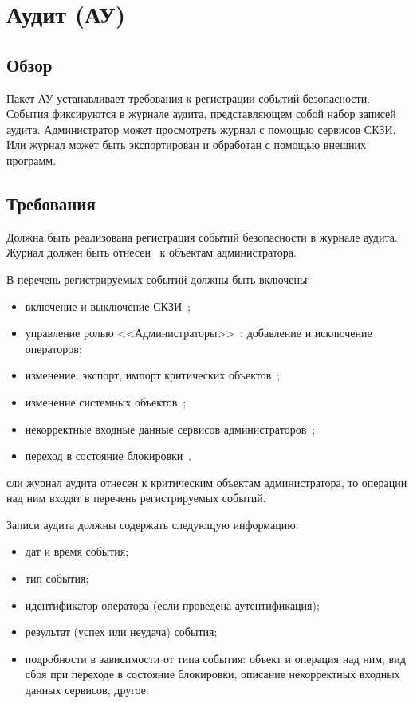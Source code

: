 \section{Аудит (АУ)}\label{AU}

\subsection{Обзор}\label{AU.Defs}

Пакет АУ устанавливает требования к регистрации событий безопасности.
События фиксируются в журнале аудита, представляющем собой набор 
записей аудита.
%
Администратор может просмотреть журнал с помощью сервисов СКЗИ.
Или журнал может быть экспортирован и обработан с помощью внешних программ.

\subsection{Требования}\label{AU.Reqs}


\label{R.AU.Log} %
Должна быть реализована регистрация событий безопасности в журнале аудита. 
Журнал должен быть отнесен~ к объектам администратора.

\label{R.AU.Events} %
В перечень регистрируемых событий должны быть включены:
\begin{itemize} 
\item
включение и выключение СКЗИ~;
\item
управление ролью <<Администраторы>>~: 
добавление и исключение операторов; 
\item
изменение, экспорт, импорт критических объектов~; 
\item
изменение системных объектов~; 
\item
некорректные входные данные сервисов администраторов~;
\item
переход в состояние блокировки~.
\end{itemize}

\begin{note*}
сли журнал аудита отнесен к критическим объектам администратора, 
то операции над ним входят в перечень регистрируемых событий.
\end{note*}

\label{R.AU.Records} %
Записи аудита должны содержать следующую информацию:
\begin{itemize} 
\item
дат и время события;
\item
тип события; 
\item
идентификатор оператора (если проведена аутентификация); 
\item
результат (успех или неудача) события; 
\item
подробности в зависимости от типа события:
объект и операция над ним,
вид сбоя при переходе в состояние блокировки,
описание некорректных входных данных сервисов,
другое.
\end{itemize}

